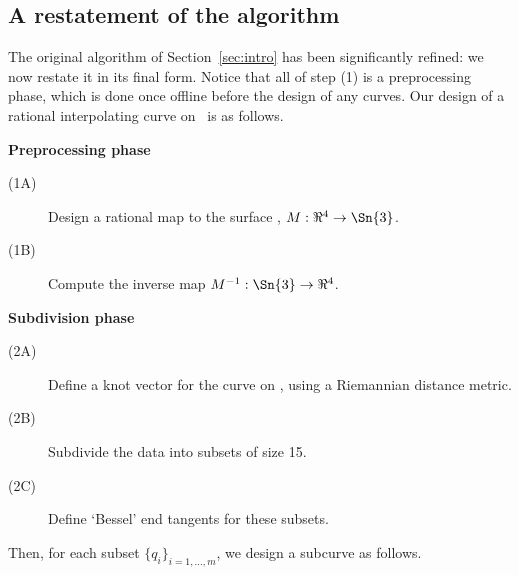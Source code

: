 
\subsection{A restatement of the algorithm}
\label{sec:restatement}

The original algorithm of Section~\ref{sec:intro} 
has been significantly refined: we now restate it in its final form.
Notice that all of step (1) is a preprocessing phase, 
which is done once offline before the design of any curves.
Our design of a rational interpolating curve on \ is as follows.

\vspace{.2in}

\centerline{{\bf Preprocessing phase}}
\begin{description}
\item[(1A)] Design a rational map to the surface , $M:\Re^4 \rightarrow \Sn{3}$.
\item[(1B)] Compute the inverse map $M^{-1}: \Sn{3} \rightarrow \Re^4$.
\end{description}

\vspace{.2in}

\centerline{{\bf Subdivision phase}}
\begin{description}
\item[(2A)] Define a knot vector for the curve on , using a
	Riemannian distance metric.
\item[(2B)] Subdivide the data into subsets of size 15.
\item[(2C)] Define `Bessel' end tangents for these subsets.
\end{description}

\vspace{.2in}

Then, for each subset $\{q_i\}_{i=1,\ldots,m}$, we design a subcurve
as follows.

\vspace{.2in}

